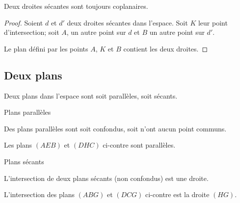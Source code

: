 \begin{propriete}
    Deux droites sécantes sont toujours coplanaires.
\end{propriete}

\begin{proof}
    Soient \( d\) et \( d'\) deux droites sécantes dans l'espace. Soit \( K\) leur point d'intersection; soit \( A\), un autre point sur \( d\) et \( B\) un autre point sur \( d'\).

    Le plan défini par les points \( A\), \( K\) et \( B\) contient les deux droites.
\end{proof}

\subsection{Deux plans}

Deux plans dans l'espace sont soit parallèles, soit sécants.
\begin{multicols}{2}

    \begin{center}
        Plans parallèles
    \end{center}
    Des plans parallèles sont soit confondus, soit n'ont aucun point communs.

Les plans \( (AEB)\) et \( (DHC)\) ci-contre sont parallèles.

\columnbreak

    \begin{center}

    \end{center}


\end{multicols}

\begin{multicols}{2}
    \begin{center}
        Plans sécants
    \end{center}
    L'intersection de deux plans sécants (non confondus) est une droite.

    L'intersection des plans \( (ABG)\) et \( (DCG)\) ci-contre est la droite \( (HG)\).

    \columnbreak

    \begin{center}

    \end{center}

\end{multicols}

